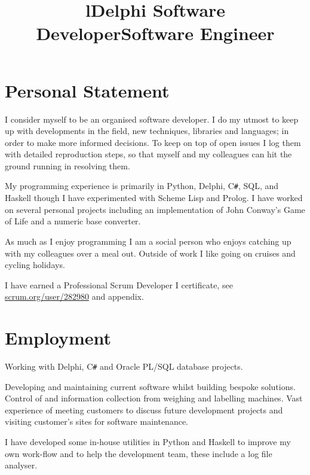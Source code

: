 \documentclass[line,margin]{res}
\title{l} \location{r} \\
\newcommand{\CSharp}{C\texttt{\#}}
\begin{document}
\begin{resume}
\section{Personal Statement}
I consider myself to be an organised software developer.
I do my utmost to keep up with developments in the field, new techniques, libraries and languages; in order to make more informed decisions.
To keep on top of open issues I log them with detailed reproduction steps, so that myself and my colleagues can hit the ground running in resolving them.

My programming experience is primarily in Python, Delphi, {\CSharp}, SQL, and Haskell though I have experimented with Scheme Lisp and Prolog.
I have worked on several personal projects including an implementation of John Conway's Game of Life and a numeric base converter.

As much as I enjoy programming I am a social person who enjoys catching up with my colleagues over a meal out.
Outside of work I like going on cruises and cycling holidays.

I have earned a Professional Scrum Developer I certificate, see \href{https://www.scrum.org/user/282980}{scrum.org/user/282980} and appendix.

\section{Employment}

\title{Delphi Software Developer}
\begin{position}
Working with Delphi, {\CSharp} and Oracle PL/SQL database projects.
\end{position}

\title{Software Engineer}
\begin{position}
Developing and maintaining current software whilst building bespoke solutions.
Control of and information collection from weighing and labelling machines.
Vast experience of meeting customers to discuss future development projects and visiting customer's sites for software maintenance.

I have developed some in-house utilities in Python and Haskell to improve my own work-flow and to help the development team, these include a log file analyser.
\end{position}


\end{resume}
\end{document}
